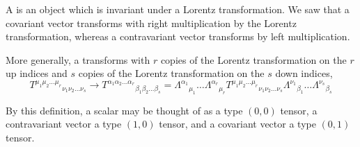 \begin{defn}
A  is an object which is invariant under a Lorentz transformation. We saw that a covariant vector transforms with right multiplication by the Lorentz transformation, whereas a contravariant vector transforms by left multiplication. 

More generally, a  transforms with $r$ copies of the Lorentz transformation on the $r$ up indices and $s$ copies of the Lorentz transformation on the $s$ down indices, 
\begin{equation}
{T^{\mu_1 \mu_2\ldots \mu_r}}_{\nu_1 \nu_2 \ldots \nu_s} \to {T^{\alpha_1 \alpha_2\ldots \alpha_r}}_{\beta_1 \beta_2 \ldots \beta_s}=\Lambda^{\alpha_1}{}_{\mu_1} \ldots \Lambda^{\alpha_r}{}_{\mu_r} {T^{\mu_1 \mu_2\ldots \mu_r}}_{\nu_1 \nu_2 \ldots \nu_s} \Lambda^{\nu_1}{}_{\beta_1}\ldots \Lambda^{\nu_s}{}_{\beta_s}
\end{equation}

By this definition, a scalar may be thought of as a type $(0,0)$ tensor, a contravariant vector a type $(1,0)$ tensor, and a covariant vector a type $(0,1)$ tensor.
\end{defn}